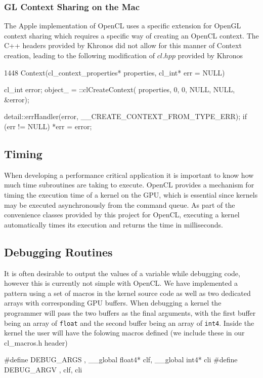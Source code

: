 \subsubsection{GL Context Sharing on the Mac}
The Apple implementation of OpenCL uses a specific extension for OpenGL context
sharing which requires a specific way of creating an OpenCL context. The C++
headers provided by Khronos did not allow for this manner of Context creation,
leading to the following modification of $cl.hpp$ provided by Khronos
\begin{cppcode}{1448}
Context(cl_context_properties* properties, cl_int* err = NULL)
    {    
        cl_int error;
        object_ = ::clCreateContext(
            properties, 0, 
            0,   
            NULL, NULL, &error);

        detail::errHandler(error, __CREATE_CONTEXT_FROM_TYPE_ERR);
        if (err != NULL) {
            *err = error;
        }    

    }    
\end{cppcode}

\subsection{Timing}

When developing a performance critical application it is important to know how
much time subroutines are taking to execute. OpenCL provides a mechanism for
timing the execution time of a kernel on the GPU, which is essential since
kernels may be executed asynchronously from the command queue. As part of the
convenience classes provided by this project for OpenCL, executing a kernel
automatically times its execution and returns the time in milliseconds.




\subsection{Debugging Routines}

It is often desirable to output the values of a variable while debugging code,
however this is currently not simple with OpenCL. We have implemented a pattern
using a set of macros in the kernel source code as well as two dedicated arrays
with corresponding GPU buffers. When debugging a kernel the programmer will
pass the two buffers as the final arguments, with the first buffer being an
array of \verb|float| and the second buffer being an array of \verb|int4|. 
Inside the kernel the user will have the folowing macros defined (we include
these in our cl\_macros.h header)
\begin{cppcode}{0}
#define DEBUG_ARGS  , __global float4* clf, __global int4* cli
#define DEBUG_ARGV  , clf, cli
\end{cppcode}

